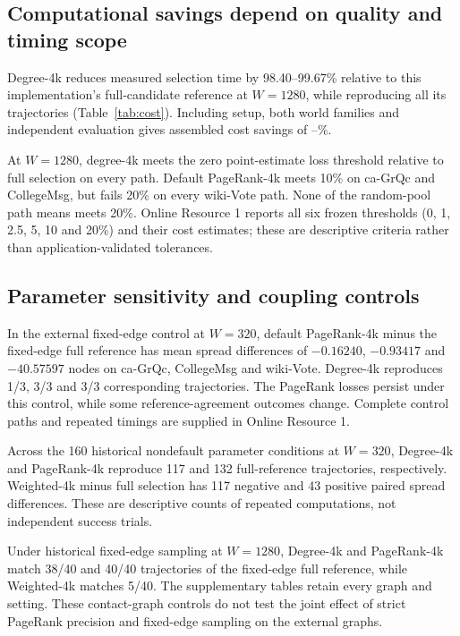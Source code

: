 \documentclass[smallextended]{svjour3}
\begin{document}
\subsection{Computational savings depend on quality and timing scope}
Degree-4k reduces measured selection time by 98.40--99.67\% relative to this implementation's full-candidate reference at $W=1280$, while reproducing all its trajectories (Table~\ref{tab:cost}). Including setup, both world families and independent evaluation gives assembled cost savings of \CollegeDegreeSaving{}--\WikiDegreeSaving{}\%.


At $W=1280$, degree-4k meets the zero point-estimate loss threshold relative to full selection on every path. Default PageRank-4k meets 10\% on ca-GrQc and CollegeMsg, but fails 20\% on every wiki-Vote path. None of the random-pool path means meets 20\%. Online Resource 1 reports all six frozen thresholds (0, 1, 2.5, 5, 10 and 20\%) and their cost estimates; these are descriptive criteria rather than application-validated tolerances.

\subsection{Parameter sensitivity and coupling controls}

In the external fixed-edge control at $W=320$, default PageRank-4k minus the fixed-edge full reference has mean spread differences of $-0.16240$, $-0.93417$ and $-40.57597$ nodes on ca-GrQc, CollegeMsg and wiki-Vote. Degree-4k reproduces 1/3, 3/3 and 3/3 corresponding trajectories. The PageRank losses persist under this control, while some reference-agreement outcomes change. Complete control paths and repeated timings are supplied in Online Resource 1.

Across the 160 historical nondefault parameter conditions at $W=320$, Degree-4k and PageRank-4k reproduce 117 and 132 full-reference trajectories, respectively. Weighted-4k minus full selection has 117 negative and 43 positive paired spread differences. These are descriptive counts of repeated computations, not independent success trials.

Under historical fixed-edge sampling at $W=1280$, Degree-4k and PageRank-4k match 38/40 and 40/40 trajectories of the fixed-edge full reference, while Weighted-4k matches 5/40. The supplementary tables retain every graph and setting. These contact-graph controls do not test the joint effect of strict PageRank precision and fixed-edge sampling on the external graphs.
\FloatBarrier
\end{document}
